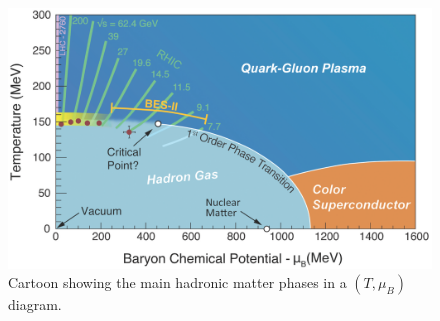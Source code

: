 \begin{figure}[!t]
\begin{center}
\includegraphics[width=0.85\linewidth]{Chapters/Introduction/Figs/QGPPhases.png}
\caption{Cartoon showing the main hadronic matter phases in a $(T,\mu_B)$ diagram.}
\label{fig:QGPPhases}
\end{center}
\end{figure}

